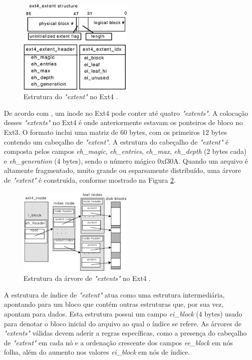 \documentclass[
	12pt,				%
	openright,			%
	oneside,			%
	a4paper,			%
	chapter=TITLE,		%
	english,			%
	french,				%
	spanish,			%
	brazil				%
	]{abntex2}
\theoremstyle{definition}
\begin{document}
\begin{figure}[H]
    \centering
    \includegraphics[width=0.5\textwidth]{fig10.jpg}
    \caption{Estrutura do \textit{"extent"} no Ext4 \cite{matur}.}
    \label{fig:fig10}
\end{figure}

De acordo com \cite{matur}, um inode no Ext4 pode conter até quatro \textit{"extents"}. A 
colocação desses \textit{"extents"} no Ext4 é onde anteriormente estavam os ponteiros de bloco no 
Ext3. O formato inclui uma matriz de 60 bytes, com os primeiros 12 bytes contendo um cabeçalho de 
\textit{"extent"}. A estrutura do cabeçalho de \textit{"extent"} é composta pelos campos 
\textit{eh\_magic}, \textit{eh\_entries}, \textit{eh\_max}, \textit{eh\_depth} 
(2 bytes cada) e \textit{eh\_generation} (4 bytes), sendo o número mágico 0xf30A. 
Quando um arquivo é altamente fragmentado, muito grande ou esparsamente distribuído, 
uma árvore de \textit{"extent"} é construída, conforme mostrado na Figura \ref{fig:fig11}.

\begin{figure}[H]
    \centering
    \includegraphics[width=0.5\textwidth]{fig11.jpg}
    \caption{Estrutura da árvore de \textit{"extents"} no Ext4 \cite{matur}.}
    \label{fig:fig11}
\end{figure}

A estrutura de índice 
de \textit{"extent"} atua como uma estrutura intermediária, apontando para um bloco que 
contém outras estruturas que, por sua vez, apontam para dados. Esta estrutura possui um campo
\textit{ei\_block} (4 bytes) usado para denotar o bloco inicial do arquivo ao qual o índice se 
refere. As árvores de \textit{"extents"} válidas devem aderir a regras específicas, 
como a presença do cabeçalho de \textit{"extent"} em cada nó e a ordenação crescente dos 
campos \textit{ee\_block} em nós folha, além do aumento nos valores \textit{ei\_block} em nós de índice.
\end{document}
